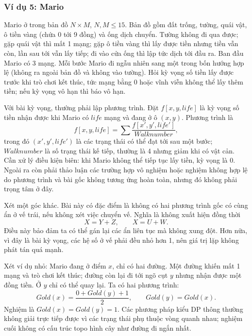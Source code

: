 \documentclass[11pt]{article}
\begin{document}
\subsubsection*{Ví dụ 5: Mario}

Mario ở trong bản đồ \(N\times M\), \(N,M\le 15\). Bản đồ gồm đất trống,
tường, quái vật, ô tiền vàng (chứa 0 tới 9 đồng) và ống dịch chuyển. Tường
không đi qua được; gặp quái vật thì mất 1 mạng; gặp ô tiền vàng thì lấy được
tiền nhưng tiền vẫn còn, lần sau tới vẫn lấy tiếp; đi vào cửa ống thì lập tức
dịch tới đầu ra. Ban đầu Mario có 3 mạng. Mỗi bước Mario đi ngẫu nhiên sang
một trong bốn hướng hợp lệ (không ra ngoài bản đồ và không vào tường). Hỏi
kỳ vọng số tiền lấy được trước khi trò chơi kết thúc, tức mạng bằng 0 hoặc
vĩnh viễn không thể lấy thêm tiền; nếu kỳ vọng vô hạn thì báo vô hạn.

Với bài kỳ vọng, thường phải lập phương trình. Đặt \(f[x,y,\mathit{life}]\)
là kỳ vọng số tiền nhận được khi Mario có \(\mathit{life}\) mạng và đang ở ô
\((x,y)\). Phương trình là
\[
  f[x,y,\mathit{life}]
  =\sum \frac{f[x',y',\mathit{life}']}{\mathit{Walknumber}},
\]
trong đó \((x',y',\mathit{life}')\) là các trạng thái có thể đạt tới sau một
bước; \(\mathit{Walknumber}\) là số trạng thái kế tiếp, thường là 4 nhưng giảm
khi có vật cản. Cần xử lý điều kiện biên: khi Mario không thể tiếp tục lấy
tiền, kỳ vọng là 0. Ngoài ra còn phải thảo luận các trường hợp vô nghiệm hoặc
nghiệm không hợp lệ do phương trình và bài gốc không tương ứng hoàn toàn, nhưng
đó không phải trọng tâm ở đây.

Xét một góc khác. Bài này có đặc điểm là không có hai phương trình gốc có cùng
ẩn ở vế trái, nếu không xét việc chuyển vế. Nghĩa là không xuất hiện đồng thời
\[
  X=Y+Z,\qquad X=U+W.
\]
Điều này bảo đảm ta có thể gán lại các ẩn liên tục mà không xung đột. Hơn
nữa, vì đây là bài kỳ vọng, các hệ số ở vế phải đều nhỏ hơn 1, nên giá trị
lặp không phát tán quá mạnh.

Xét ví dụ nhỏ: Mario đang ở điểm \(x\), chỉ có hai đường. Một đường khiến mất
1 mạng và trò chơi kết thúc; đường còn lại đi tới ngõ cụt \(y\) nhưng nhận
được một đồng tiền. Ở \(y\) chỉ có thể quay lại. Ta có hai phương trình:
\[
  \mathit{Gold}(x)=\frac{0+\mathit{Gold}(y)+1}{2},\qquad
  \mathit{Gold}(y)=\mathit{Gold}(x).
\]
Nghiệm là \(\mathit{Gold}(x)=\mathit{Gold}(y)=1\). Các phương pháp kiểu DP
thông thường không giải trực tiếp được vì các trạng thái phụ thuộc vòng quanh
nhau; nghiệm cuối không có cấu trúc topo hình cây như đường đi ngắn nhất.
\end{document}
